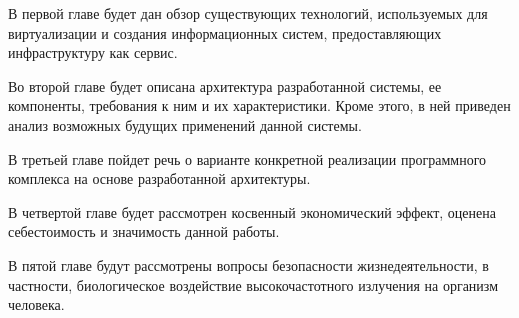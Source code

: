 В первой главе будет дан обзор существующих технологий, используемых для виртуализации
и создания информационных систем, предоставляющих инфраструктуру как сервис. 

Во второй главе будет описана архитектура разработанной системы, ее компоненты, требования
к ним и их характеристики. Кроме этого, в ней приведен анализ возможных будущих 
применений данной системы.

В третьей главе пойдет речь о варианте конкретной реализации программного комплекса на 
основе разработанной архитектуры.

В четвертой главе будет рассмотрен косвенный экономический эффект, оценена
себестоимость и значимость данной работы.

В пятой главе будут рассмотрены вопросы безопасности жизнедеятельности, в частности,
биологическое воздействие высокочастотного излучения на организм человека.




